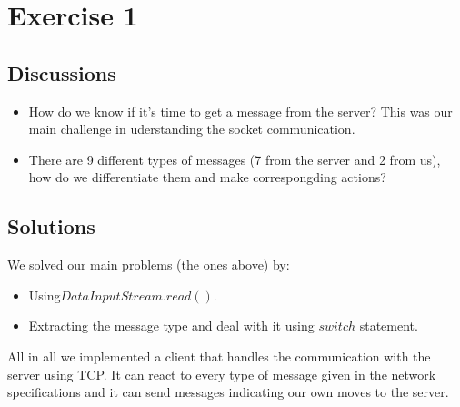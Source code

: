 \section{Exercise 1}
\subsection{Discussions}
\begin{itemize}
    \item How do we know if it's time to get a message from the server? This was our main challenge in uderstanding the socket communication.
    \item There are 9 different types of messages (7 from the server and 2 from us), how do we differentiate them and make correspongding actions?
    
\end{itemize}

\subsection{Solutions}
We solved our main problems (the ones above) by:
\begin{itemize}
    \item Using$DataInputStream.read()$.
    \item Extracting the message type and deal with it using $switch$ statement.
\end{itemize}
    All in all we implemented a client that handles the communication with the server using TCP. It can react to every type of message given in the network specifications and it can send messages indicating our own moves to the server.


  

